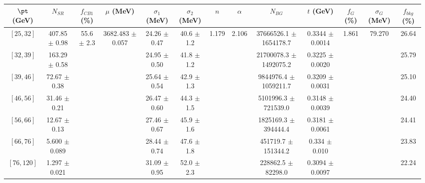 \begin{tabular}{c||c|c|c|c|c|c|c|c|c|c|c||c}
$\pt$ (GeV) & $N_{SR}$ & $f_{CB1}$ (\%) & $\mu$ (MeV) & $\sigma_1$ (MeV) & $\sigma_2$ (MeV) & $n$ & $\alpha$ & $N_{BG}$ & $t$ (GeV) & $f_G$ (\%) & $\sigma_G$ (MeV) & $f_{bkg}$ (\%) \\
\hline
$[25, 32]$ & 407.85 $\pm$ 0.98 & \multirow{7}{*}{55.6 $\pm$ 2.3} & \multirow{7}{*}{3682.483 $\pm$ 0.057} & 24.26 $\pm$ 0.47 & 40.6 $\pm$ 1.2 & \multirow{7}{*}{1.179} & \multirow{7}{*}{2.106} & 37666526.1 $\pm$ 1654178.7 & 0.3344 $\pm$ 0.0014 & \multirow{7}{*}{1.861} & \multirow{7}{*}{79.270} & 26.64\\
$[32, 39]$ & 163.29 $\pm$ 0.58 &  &  & 24.95 $\pm$ 0.50 & 41.8 $\pm$ 1.2 &  &  & 21700078.3 $\pm$ 1492075.2 & 0.3225 $\pm$ 0.0020 &  &  & 25.79\\
$[39, 46]$ & 72.67 $\pm$ 0.38 &  &  & 25.64 $\pm$ 0.54 & 42.9 $\pm$ 1.3 &  &  & 9844976.4 $\pm$ 1059211.7 & 0.3209 $\pm$ 0.0031 &  &  & 25.10\\
$[46, 56]$ & 31.46 $\pm$ 0.21 &  &  & 26.47 $\pm$ 0.60 & 44.3 $\pm$ 1.5 &  &  & 5101996.3 $\pm$ 721539.0 & 0.3148 $\pm$ 0.0039 &  &  & 24.40\\
$[56, 66]$ & 12.67 $\pm$ 0.13 &  &  & 27.46 $\pm$ 0.67 & 45.9 $\pm$ 1.6 &  &  & 1825169.3 $\pm$ 394444.4 & 0.3181 $\pm$ 0.0061 &  &  & 24.41\\
$[66, 76]$ & 5.600 $\pm$ 0.089 &  &  & 28.44 $\pm$ 0.74 & 47.6 $\pm$ 1.8 &  &  & 451719.7 $\pm$ 151344.2 & 0.334 $\pm$ 0.010 &  &  & 23.83\\
$[76, 120]$ & 1.297 $\pm$ 0.021 &  &  & 31.09 $\pm$ 0.95 & 52.0 $\pm$ 2.3 &  &  & 228862.5 $\pm$ 82298.0 & 0.3094 $\pm$ 0.0097 &  &  & 22.24\\
\end{tabular}
